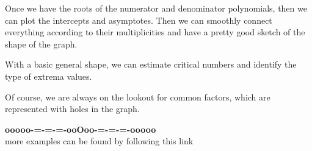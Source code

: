 \documentclass{ximera}
\begin{document}
Once we have the roots of the numerator and denominator polynomials, then we can plot the intercepts and asymptotes.  Then we can smoothly connect everything according to their multiplicities and have a pretty good sketch of the shape of the graph.

With a basic general shape, we can estimate critical numbers and identify the type of extrema values. 

Of course, we are always on the lookout for common factors, which are represented with holes in the graph. 


















\begin{onlineOnly}
\begin{center}
\textbf{\textcolor{green!50!black}{ooooo-=-=-=-ooOoo-=-=-=-ooooo}} \\

more examples can be found by following this link\\ 

\end{center}
\end{onlineOnly}
\end{document}
